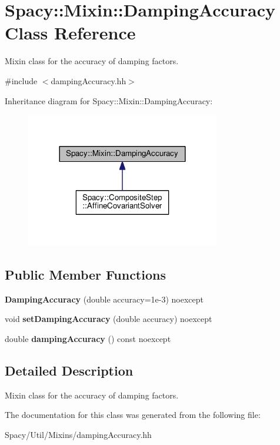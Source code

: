 \hypertarget{classSpacy_1_1Mixin_1_1DampingAccuracy}{}\section{Spacy\+:\+:Mixin\+:\+:Damping\+Accuracy Class Reference}
\label{classSpacy_1_1Mixin_1_1DampingAccuracy}


Mixin class for the accuracy of damping factors.  




{\ttfamily \#include $<$damping\+Accuracy.\+hh$>$}



Inheritance diagram for Spacy\+:\+:Mixin\+:\+:Damping\+Accuracy\+:\nopagebreak
\begin{figure}[H]
\begin{center}
\leavevmode
\includegraphics[width=240pt]{classSpacy_1_1Mixin_1_1DampingAccuracy__inherit__graph}
\end{center}
\end{figure}
\subsection*{Public Member Functions}
\begin{DoxyCompactItemize}
\item 
\hypertarget{classSpacy_1_1Mixin_1_1DampingAccuracy_a3cc2f537debc13218852ae8bfbcc4b37}{}{\bfseries Damping\+Accuracy} (double accuracy=1e-\/3) noexcept\label{classSpacy_1_1Mixin_1_1DampingAccuracy_a3cc2f537debc13218852ae8bfbcc4b37}

\item 
\hypertarget{classSpacy_1_1Mixin_1_1DampingAccuracy_af934aaf17595b7029d9a8ecec2561599}{}void {\bfseries set\+Damping\+Accuracy} (double accuracy) noexcept\label{classSpacy_1_1Mixin_1_1DampingAccuracy_af934aaf17595b7029d9a8ecec2561599}

\item 
\hypertarget{classSpacy_1_1Mixin_1_1DampingAccuracy_a070c4c1b64c4392c6b21478bcf4c4a75}{}double {\bfseries damping\+Accuracy} () const noexcept\label{classSpacy_1_1Mixin_1_1DampingAccuracy_a070c4c1b64c4392c6b21478bcf4c4a75}

\end{DoxyCompactItemize}


\subsection{Detailed Description}
Mixin class for the accuracy of damping factors. 

The documentation for this class was generated from the following file\+:\begin{DoxyCompactItemize}
\item 
Spacy/\+Util/\+Mixins/damping\+Accuracy.\+hh\end{DoxyCompactItemize}
